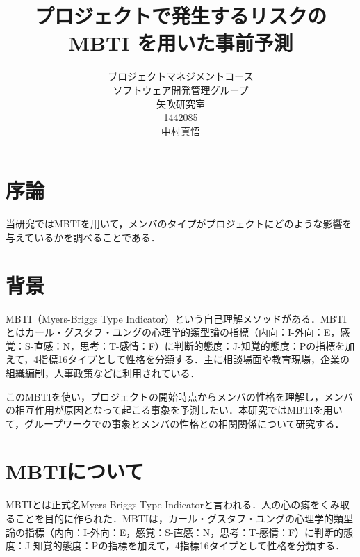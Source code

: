 \title{プロジェクトで発生するリスクのMBTI を用いた事前予測}
\author{プロジェクトマネジメントコース\\
ソフトウェア開発管理グループ\\
矢吹研究室\\
1442085\\
中村真悟}
\date{}

\maketitle



\tableofcontents%

\chapter{序論}

当研究ではMBTIを用いて，メンバのタイプがプロジェクトにどのような影響を与えているかを調べることである．

\chapter{背景}

MBTI（Myers-Briggs Type Indicator）という自己理解メソッドがある．MBTIとはカール・グスタフ・ユングの心理学的類型論の指標（内向：I-外向：E，感覚：S-直感：N，思考：T-感情：F）に判断的態度：J-知覚的態度：Pの指標を加えて，4指標16タイプとして性格を分類する．主に相談場面や教育現場，企業の組織編制，人事政策などに利用されている\cite{110001230195}．

このMBTIを使い，プロジェクトの開始時点からメンバの性格を理解し，メンバの相互作用が原因となって起こる事象を予測したい．本研究ではMBTIを用いて，グループワークでの事象とメンバの性格との相関関係について研究する．

\chapter{MBTIについて}

MBTIとは正式名Myers-Briggs Type Indicatorと言われる．人の心の癖をくみ取ることを目的に作られた．MBTIは，カール・グスタフ・ユングの心理学的類型論の指標（内向：I-外向：E，感覚：S-直感：N，思考：T-感情：F）に判断的態度：J-知覚的態度：Pの指標を加えて，4指標16タイプとして性格を分類する．

